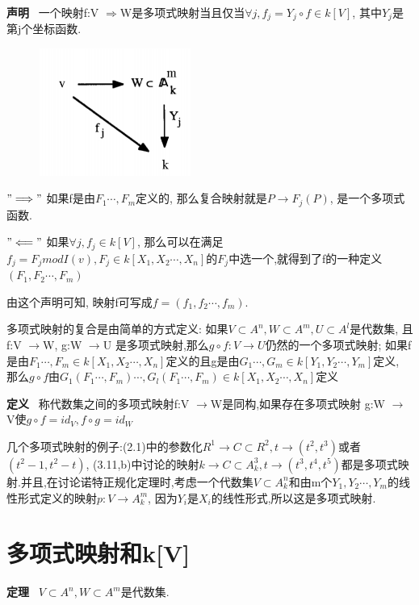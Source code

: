 \documentclass[UTF8]{book}
\begin{document}
		\textbf{声明} \ 一个映射f:V $\Rightarrow $W是多项式映射当且仅当$\forall  j, f_{j}=Y_{j}\circ f \in k[V]$, 其中$Y_{j}$是第j个坐标函数.
		\begin{figure}[h]
		  \centering
		  \includegraphics[width=5cm]{68.jpg}\\
		\end{figure}


		$"\Longrightarrow"$
		如果f是由$F_{1}\cdots,F_{m}$定义的, 那么复合映射就是$P\rightarrow F_{j}(P)$, 是一个多项式函数.

		$"\Longleftarrow"$
		如果$\forall  j, f_{j}\in k[V] $, 那么可以在满足$f_{j}=F_{j} mod I(v), F_{j}\in k[X_{1},X_{2}\cdots,X_{n}]$的$F_{j}$中选一个,就得到了f的一种定义$(F_{1},F_{2}\cdots,F_{m})$

		由这个声明可知, 映射f可写成$f=(f_{1},f_{2}\cdots,f_{m})$.

		多项式映射的复合是由简单的方式定义: 如果$V\subset A^{n}, W\subset A^{m}, U\subset A^{l}$是代数集, 且f:V $\rightarrow $W, g:W $\rightarrow $U 是多项式映射,那么$g\circ f :V \rightarrow U$仍然的一个多项式映射; 如果f是由$F_{1}\cdots,F_{m}\in k[X_{1},X_{2}\cdots,X_{n}]$定义的且g是由$G_{1}\cdots,G_{m}\in k[Y_{1},Y_{2}\cdots,Y_{m}]$定义, 那么$g\circ f$由$G_{1}(F_{1}\cdots,F_{m})\cdots,G_{l}(F_{1}\cdots,F_{m})\in k[X_{1},X_{2}\cdots,X_{n}]$定义

		\textbf{定义} \ 称代数集之间的多项式映射f:V $\rightarrow $W是同构,如果存在多项式映射 g:W $\rightarrow $V使$g\circ f=id_{V}, f\circ g=id_{W}$

		几个多项式映射的例子:(2.1)中的参数化$R^{1}\rightarrow C\subset R^{2}, t\rightarrow (t^{2},t^{3})$或者$(t^{2}-1,t^{2}-t)$, (3.11,b)中讨论的映射$k\rightarrow C\subset A^{3}_{k}, t\rightarrow (t^{3},t^{4},t^{5})$都是多项式映射.并且,在讨论诺特正规化定理时,考虑一个代数集$V\subset A^{n}_{k}$和由m个$Y_{1},Y_{2}\cdots,Y_{m}$的线性形式定义的映射$p:V\rightarrow A^{m}_{k}$, 因为$Y_{i}$是$X_{i}$的线性形式,所以这是多项式映射.

	\section{多项式映射和k[V]}
		\textbf{定理} \ $V\subset A^{n},W\subset A^{m}$是代数集.
\end{document}
